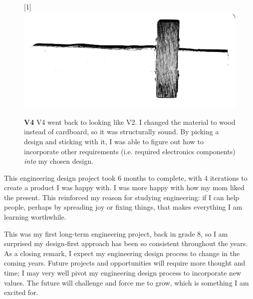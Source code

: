 \documentclass{antiquebook}
\begin{document}
	\begin{figure}[H]
		\scalebox{-1}[1]{\includegraphics[width=\linewidth]{swordv4.png}}
		\caption{\textbf{V4} \quad V4 went back to looking like V2. I changed the material to wood instead of cardboard, so it was structurally sound. By picking a design and sticking with it, I was able to figure out how to incorporate other requirements (i.e. required electronics components) \textit{into} my chosen design. }
	\end{figure}

	This engineering design project took 6 months to complete, with 4 iterations to create a product I was happy with. I was more happy with how my mom liked the present. This reinforced my reason for studying engineering: if I can help people, perhaps by spreading joy or fixing things, that makes everything I am learning worthwhile.
	
	This was my first long-term engineering project, back in grade 8, so I am surprised my design-first approach has been so consistent throughout the years. As a closing remark, I expect my engineering design process to change in the coming years. Future projects and opportunities will require more thought and time; I may very well pivot my engineering design process to incorporate new values. The future will challenge and force me to grow, which is something I am excited for.



	
\end{document}

